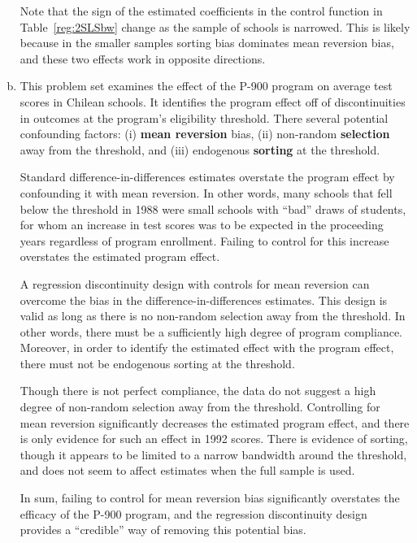 \documentclass{article}
\begin{document}
\begin{enumerate}[(a)]
Note that the sign of the estimated coefficients in the control function  in Table~\ref{reg:2SLSbw} change as the sample of schools is narrowed. This is likely because in the smaller samples sorting bias dominates mean reversion bias, and these two effects work in opposite directions.

\item This problem set examines the effect of the P-900 program on average test scores in Chilean schools. It identifies the program effect off of discontinuities in outcomes at the program's eligibility threshold. There several potential confounding factors: (i) {\bf mean reversion} bias, (ii) non-random {\bf selection} away from the threshold, and (iii) endogenous {\bf sorting} at the threshold.

Standard difference-in-differences estimates overstate the program effect by confounding it with mean reversion. In other words, many schools that fell below the threshold in 1988 were small schools with ``bad'' draws of students, for whom an increase in test scores was to be expected in the proceeding years regardless of program enrollment. Failing to control for this increase overstates the estimated program effect.

A regression discontinuity design with controls for mean reversion can overcome the bias in the difference-in-differences estimates. This design is valid as long as there is no non-random selection away from the threshold. In other words, there must be a sufficiently high degree of program compliance. Moreover, in order to identify the estimated effect with the program effect, there must not be endogenous sorting at the threshold.

Though there is not perfect compliance, the data do not suggest a high degree of non-random selection away from the threshold. Controlling for mean reversion significantly decreases the estimated program effect, and there is only evidence for such an effect in 1992 scores. There is evidence of sorting, though it appears to be limited to a narrow bandwidth around the threshold, and does not seem to affect estimates when the full sample is used.

In sum, failing to control for mean reversion bias significantly overstates the efficacy of the P-900 program, and the regression discontinuity design provides a ``credible'' way of removing this potential bias.

\end{enumerate}
\end{document}
